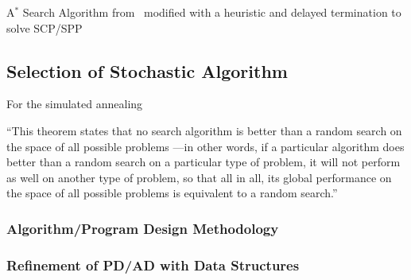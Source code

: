 \documentclass[conference]{IEEEtran}
\newcommand{\LineComment}[1]{\Statex /* \hfill \textit{#1} \hfill*/}    %
\begin{document}
\begin{algorithm}[ht!]
    \caption{A$^*$ Search Algorithm from~\cite{pearl1984} modified with a
    heuristic and delayed termination to solve SCP/SPP}
    \label{alg:astar}
\end{algorithm}


\subsection{Selection of Stochastic Algorithm}
For the simulated annealing

``This theorem states that no search algorithm is better than a random search
on the space of all possible problems —in other words, if a particular
algorithm does better than a random search on a particular type of problem, it
will not perform as well on another type of problem, so that all in all, its
global performance on the space of all possible problems is equivalent to a
random search.''~\cite{collet2007, wiki:nfl}

\subsubsection{Algorithm/Program Design Methodology}



\subsubsection{Refinement of PD/AD with Data Structures}
\end{document}
